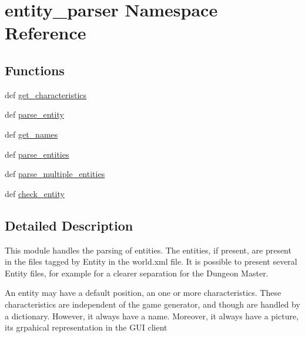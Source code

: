 \hypertarget{namespaceentity__parser}{\section{entity\-\_\-parser \-Namespace \-Reference}
\label{namespaceentity__parser}
}
\subsection*{\-Functions}
\begin{DoxyCompactItemize}
\item 
def \hyperlink{namespaceentity__parser_a461ad958a5140cf43ab6df7fc0fa674c}{get\-\_\-characteristics}
\item 
def \hyperlink{namespaceentity__parser_a375086fc461ad642439447103e246702}{parse\-\_\-entity}
\item 
def \hyperlink{namespaceentity__parser_ad200dc44d7e911a8274a2657e1111a59}{get\-\_\-names}
\item 
def \hyperlink{namespaceentity__parser_a1eaa358c24aa439533e3c5f2cf5ce469}{parse\-\_\-entities}
\item 
def \hyperlink{namespaceentity__parser_a6038c2dd979d32b9a8a8b3e93332e2ab}{parse\-\_\-multiple\-\_\-entities}
\item 
def \hyperlink{namespaceentity__parser_ae7751550a5d047237c6050e133ed1852}{check\-\_\-entity}
\end{DoxyCompactItemize}


\subsection{\-Detailed \-Description}
\begin{DoxyVerb}
This module handles the parsing of entities.
The entities, if present, are present in the files tagged by Entity in the
world.xml file.
It is possible to present several Entity files, for example for a clearer
separation for the Dungeon Master.

An entity may have a default position, an one or more characteristics.
These characteristics are independent of the game generator, and though are
handled by a dictionary. However, it always have a name. Moreover,
it always have a picture, its grpahical representation in the GUI client
\end{DoxyVerb}
 

